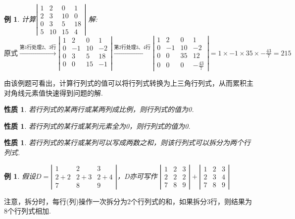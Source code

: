 \documentclass[12pt, a4paper, oneside]{ctexbook}
\newtheorem{example}[theorem]{例}
\newtheorem{quolity}[theorem]{性质}
\begin{document}
\begin{example}
    计算$\left | \begin{matrix}
        1 & 2  & 0  & 1 \\
        2 & 3  & 10 & 0 \\
        0 & 3  & 5  & 18 \\
        5 & 10 & 15 & 4
    \end{matrix} \right |$
    \newline
    解: $\mbox{原式} \xrightarrow{\mbox{第1行处理2、3行}} \left | \begin{matrix}
        1 & 2  & 0  & 1 \\
        0 & -1 & 10 & -2 \\
        0 & 3  & 5  & 18 \\
        0 & 0  & 15 & -1 \\
    \end{matrix} \right | \xrightarrow{\mbox{第2行处理3、4行}} \left | \begin{matrix}
        1 & 2  & 0  & 1 \\
        0 & -1 & 10 & -2 \\
        0 & 0  & 35 & 12 \\
        0 & 0  & 0  & -\frac{43}{7}
    \end{matrix} \right | = 1 \times -1 \times 35 \times -\frac{43}{7} = 215$
\end{example}

由该例题可看出，计算行列式的值可以将行列式转换为上三角行列式，从而累积主对角线元素值快速得到问题的解. 

\begin{quolity}
    若行列式的某两行或某两列成比例，则行列式的值为0. 
\end{quolity}

\begin{quolity}
    若行列式的某行或某列元素全为0，则行列式的值为0. 
\end{quolity}

\begin{quolity}
    若行列式的某行或某列可以写成两数之和，则该行列式可以拆分为两个行列式. 
\end{quolity}

\begin{example}
    假设$D=\left | \begin{matrix}
        1   & 2   & 3   \\
        2+2 & 2+3 & 2+4 \\
        7   & 8   & 9
    \end{matrix} \right |$，D亦可写作
    $\left | \begin{matrix}
        1   & 2   & 3 \\
        2   & 2   & 2 \\
        7   & 8   & 9
    \end{matrix} \right | + \left | \begin{matrix}
        1   & 2   & 3 \\
        2   & 3   & 4 \\
        7   & 8   & 9
    \end{matrix} \right |$
\end{example}
注意，拆分时，每行(列)操作一次拆分为2个行列式的和，如果拆分3行，则结果为8个行列式相加. 
\end{document}
